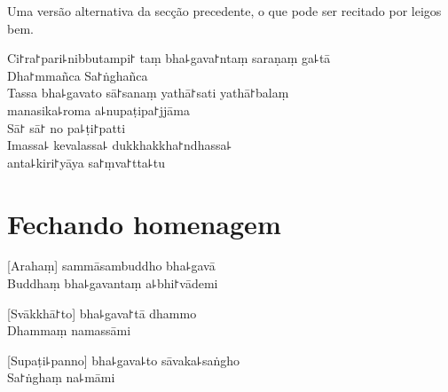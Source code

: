 \clearpage

\begin{instruction}
  Uma versão alternativa da secção precedente, o que pode ser recitado por leigos bem.
\end{instruction}

Ci꜓ra꜓pari꜕nibbutampi꜓ taṃ bha꜕gava꜓ntaṃ saraṇaṃ ga꜕tā\\
Dha꜓mmañca Sa꜓ṅghañca\\
Tassa bha꜕gavato sā꜓sanaṃ yathā꜓sati yathā꜓balaṃ\\
\vin manasika꜕roma a꜕nupaṭipa꜓jjāma\\
Sā꜓ sā꜓ no pa꜕ṭi꜓patti\\
Imassa꜕ kevalassa꜕ dukkhakkha꜓ndhassa꜕\\
\vin anta꜕kiri꜓yāya sa꜓ṃva꜓tta꜕tu

\chapter{Fechando homenagem}       %

[Arahaṃ] sammāsambuddho bha꜕gavā\\
Buddhaṃ bha꜕gavantaṃ a꜕bhi꜓vādemi 

[Svākkhā꜓to] bha꜕gava꜓tā dhammo\\
Dhammaṃ namassāmi 

[Supaṭi꜕panno] bha꜕gava꜕to sāvaka꜕saṅgho\\
Sa꜓ṅghaṃ na꜕māmi 


